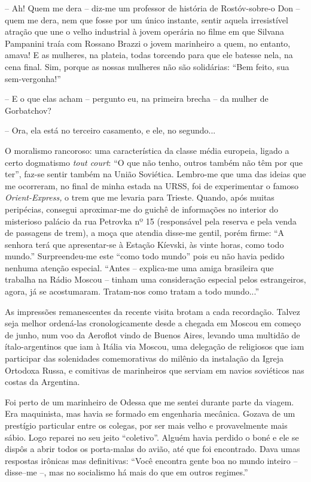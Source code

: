 -- Ah! Quem me dera -- diz-me um professor de história de Rostóv-sobre-o
Don -- quem me dera, nem que fosse por um único instante, sentir aquela
irresistível atração que une o velho industrial à jovem operária no
filme em que Silvana Pampanini traía com Rossano Brazzi o jovem
marinheiro a quem, no entanto, amava! E as mulheres, na plateia, todas
torcendo para que ele batesse nela, na cena final. Sim, porque as nossas
mulheres não são solidárias: ``Bem feito, sua sem-vergonha!''

-- E o que elas acham -- pergunto eu, na primeira brecha -- da mulher de
Gorbatchov?

-- Ora, ela está no terceiro casamento, e ele, no segundo...

O moralismo rancoroso: uma característica da classe média europeia,
ligado a certo dogmatismo \emph{tout court}: ``O que não tenho, outros
também não têm por que ter'', faz-se sentir também na União Soviética.
Lembro-me que uma das ideias que me ocorreram, no final de minha estada
na URSS, foi de experimentar o famoso \emph{Orient-Express,} o trem que
me levaria para Trieste. Quando, após muitas peripécias, consegui
aproximar-me do guichê de informações no interior do misterioso palácio
da rua Petrovka nº 15 (responsável pela reserva e pela venda de
passagens de trem), a moça que atendia disse-me gentil, porém firme: ``A
senhora terá que apresentar-se à Estação Kíevski, às vinte horas, como
todo mundo.'' Surpreendeu-me este ``como todo mundo'' pois eu não havia
pedido nenhuma atenção especial. ``Antes -- explica-me uma amiga
brasileira que trabalha na Rádio Moscou -- tinham uma consideração
especial pelos estrangeiros, agora, já se acostumaram. Tratam-nos como
tratam a todo mundo...''

As impressões remanescentes da recente visita brotam a cada recordação.
Talvez seja melhor ordená-las cronologicamente desde a chegada em Moscou
em começo de junho, num voo da Aeroflot vindo de Buenos Aires, levando
uma multidão de ítalo-argentinos que iam à Itália via Moscou, uma
delegação de religiosos que iam participar das solenidades comemorativas
do milênio da instalação da Igreja Ortodoxa Russa, e comitivas de
marinheiros que serviam em navios soviéticos nas costas da Argentina.

Foi perto de um marinheiro de Odessa que me sentei durante parte da
viagem. Era maquinista, mas havia se formado em engenharia mecânica.
Gozava de um prestígio particular entre os colegas, por ser mais velho e
provavelmente mais sábio. Logo reparei no seu jeito ``coletivo''. Alguém
havia perdido o boné e ele se dispôs a abrir todos os porta-malas do
avião, até que foi encontrado. Dava umas respostas irônicas mas
definitivas: ``Você encontra gente boa no mundo inteiro -- disse--me --,
mas no socialismo há mais do que em outros regimes.''

